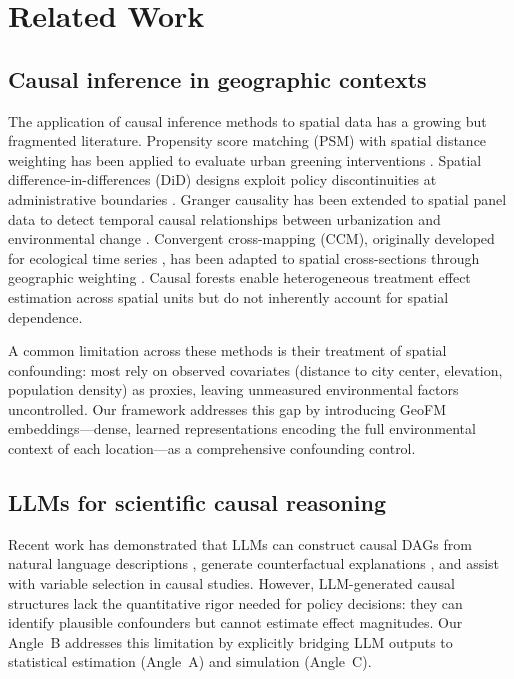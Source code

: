 \documentclass{article}
\begin{document}
\section{Related Work}
\label{sec:related}

\subsection{Causal inference in geographic contexts}

The application of causal inference methods to spatial data has a growing but fragmented literature. Propensity score matching (PSM) with spatial distance weighting has been applied to evaluate urban greening interventions \citep{stuart2010matching}. Spatial difference-in-differences (DiD) designs exploit policy discontinuities at administrative boundaries \citep{angrist2009mostly}. Granger causality has been extended to spatial panel data to detect temporal causal relationships between urbanization and environmental change \citep{granger1969investigating}. Convergent cross-mapping (CCM), originally developed for ecological time series \citep{sugihara2012detecting}, has been adapted to spatial cross-sections through geographic weighting \citep{clark2015spatial}. Causal forests \citep{athey2019estimating} enable heterogeneous treatment effect estimation across spatial units but do not inherently account for spatial dependence.

A common limitation across these methods is their treatment of spatial confounding: most rely on observed covariates (distance to city center, elevation, population density) as proxies, leaving unmeasured environmental factors uncontrolled. Our framework addresses this gap by introducing GeoFM embeddings---dense, learned representations encoding the full environmental context of each location---as a comprehensive confounding control.

\subsection{LLMs for scientific causal reasoning}

Recent work has demonstrated that LLMs can construct causal DAGs from natural language descriptions \citep{kiciman2023causal}, generate counterfactual explanations \citep{chen2024causalllm}, and assist with variable selection in causal studies. However, LLM-generated causal structures lack the quantitative rigor needed for policy decisions: they can identify plausible confounders but cannot estimate effect magnitudes. Our Angle~B addresses this limitation by explicitly bridging LLM outputs to statistical estimation (Angle~A) and simulation (Angle~C).
\end{document}
